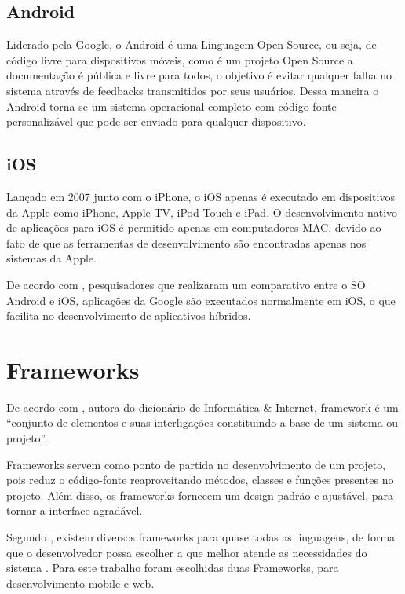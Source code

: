 \subsection{Android}

Liderado pela Google, o Android é uma Linguagem Open Source, ou seja, de código livre para dispositivos móveis, como é um projeto Open Source a documentação é pública e livre para todos, o objetivo é evitar qualquer falha no sistema através de feedbacks transmitidos por seus usuários. Dessa maneira o Android torna-se um sistema operacional completo com código-fonte personalizável que pode ser enviado para qualquer dispositivo.


\subsection{iOS}

Lançado em 2007 junto com o iPhone, o iOS apenas é executado em dispositivos da Apple como iPhone, Apple TV, iPod Touch e iPad. O desenvolvimento nativo de aplicações para iOS é permitido apenas em computadores MAC, devido ao fato de que as ferramentas de desenvolvimento são encontradas apenas nos sistemas da Apple.\cite{garbin2014sistema}

De acordo com , pesquisadores que realizaram um comparativo entre o SO Android e iOS, aplicações da Google são executados normalmente em iOS, o que facilita no desenvolvimento de aplicativos híbridos.

\section{Frameworks}

De acordo com , autora do dicionário de Informática \& Internet, framework é um “conjunto de elementos e suas interligações constituindo a base de um sistema ou projeto”.

Frameworks servem como ponto de partida no desenvolvimento de um projeto, pois reduz o código-fonte reaproveitando métodos, classes e funções presentes no projeto. Além disso, os frameworks fornecem um design padrão e ajustável, para tornar a interface agradável.\cite{gabardo2017laravel}

Segundo , existem diversos frameworks para quase todas as linguagens, de forma que o desenvolvedor possa escolher a que melhor atende as necessidades do sistema . Para este trabalho foram escolhidas duas Frameworks, para desenvolvimento mobile e web.

